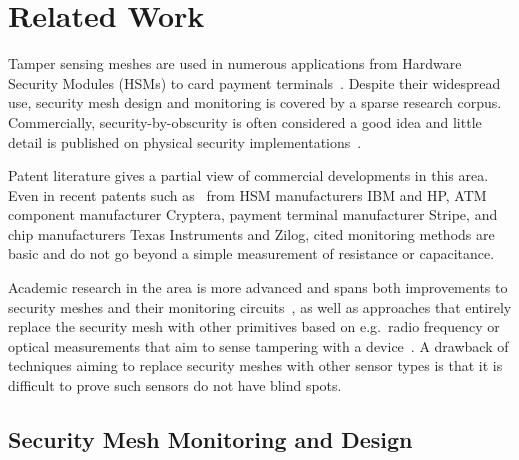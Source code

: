 \documentclass[final]{iacrtrans}
\begin{document}
\section{Related Work}

Tamper sensing meshes are used in numerous applications from Hardware Security Modules (HSMs) to card payment
terminals~\cite{andersonCryptographicProcessorsASurvey2006,tehranipoorHardwareSecurityPrimitives2023}. Despite their
widespread use, security mesh design and monitoring is covered by a sparse research corpus. Commercially,
security-by-obscurity is often considered a good idea and little detail is published on physical security
implementations~\cite{andersonSecurityEngineeringGuide2020}.

Patent literature gives a partial view of commercial developments in this area. Even in recent patents such as~\cite{
    brodskyTamperRespondentAssemblyFlexible2019, %
    nortonTamperDetectingCases2019, %
    razaghiTamperDetectionSystem2020, %
    wesselhoffTamperResponsiveSensor2020, %
    leekTamperDetection2021, %
    chockPointSaleTerminal2009, %
}
from HSM manufacturers IBM and HP, ATM component manufacturer Cryptera, payment terminal manufacturer Stripe, and chip
manufacturers Texas Instruments and Zilog, cited monitoring methods are basic and do not go beyond a simple measurement
of resistance or capacitance.

Academic research in the area is more advanced and spans both improvements to security meshes and their monitoring
circuits~\cite{
    immlerBTREPIDBatterylessTamperresistant2018,
    dupontMiniaturizedUltraLowPowerTamper2022,
    vasileProtectingSecretsAdvanced2019},
as well as approaches that entirely replace the security mesh with other primitives based on e.g.\ radio frequency or
optical measurements that aim to sense tampering
with a device~\cite{staatAntiTamperRadioSystemLevel2022,vaiSecureArchitectureEmbedded2015}. A drawback of techniques
aiming to replace security meshes with other sensor types is that it is difficult to prove such sensors do not have
blind spots.

\subsection{Security Mesh Monitoring and Design}
\end{document}
